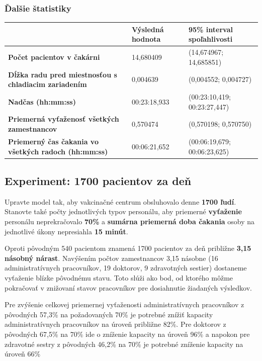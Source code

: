 \documentclass[letterpaper]{article}
\begin{document}
	\subsubsection*{Ďalšie štatistiky}
	
	\begin{table}[hbt!]
		\begin{tabular}{p{6cm}|p{4.5cm}p{4.5cm}}
			& \textbf{Výsledná hodnota} & \textbf{95\% interval spoľahlivosti} \\
			\hline\hline
			\textbf{Počet pacientov v čakárni} 								& 14,680409           & (14,674967; 14,685851)			
			\\\hline
			\textbf{Dĺžka radu pred miestnosťou s chladiacim zariadením}	& 0,004639            & (0,004552; 0,004727)	
			\\\hline
			\textbf{Nadčas (hh:mm:ss)}										& 00:23:18,933        & (00:23:10,419; 00:23:27,447)
			\\\hline
			\textbf{Priemerná vyťaženosť všetkých zamestnancov}  			& 0,570474            & (0,570198; 0,570750)
			\\\hline
			\textbf{Priemerný čas čakania vo všetkých radoch (hh:mm:ss)}	& 00:06:21,652        & (00:06:19,679; 00:06:23,625)
		\end{tabular}
	\end{table}

	\subsection{Experiment: 1700 pacientov za deň}
	
	Upravte model tak, aby vakcinačné centrum obsluhovalo denne \textbf{1700 ľudí}. Stanovte také počty jednotlivých typov personálu, aby priemerné \textbf{vyťaženie} personálu neprekračovalo \textbf{70\%} a \textbf{sumárna priemerná doba čakania} osoby na jednotlivé úkony nepresiahla \textbf{15 minút}.
	
	Oproti pôvodným 540 pacientom znamená 1700 pacientov za deň približne \textbf{3,15 násobný nárast}. Navýšením počtov zamestnancov 3,15 násobne (16 administratívnych pracovníkov, 19 doktorov, 9 zdravotných sestier) dostaneme vyťaženie blízke pôvodnému stavu. Toto slúži ako bod, od ktorého môžme pokračovať v znižovaní stavov pracovníkov pre dosiahnutie žiadaných výsledkov.
	
	Pre zvýšenie celkovej priemernej vyťaženosti administratívnych pracovníkov z pôvodných 57,3\% na požadovaných 70\% je potrebné znížiť kapacity administratívnych pracovníkov na úroveň približne 82\%. Pre doktorov z pôvodných 67,5\% na 70\% ide o zníženie kapacity na úroveň 96\% a napokon pre zdravotné sestry z pôvodných 46,2\% na 70\% je potrebné zníženie kapacity na úroveň 66\%
	
\end{document}

